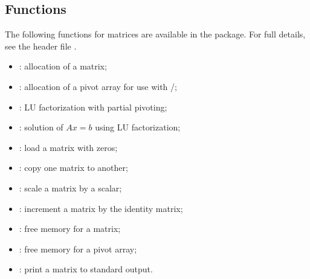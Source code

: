 \subsection{Functions}
The following functions for  matrices are available
in the {\band} package.  For full details, see the header file .
\begin{itemize}
\item {}: allocation of a  matrix;
\item {}: allocation of a pivot array for use
      with /;
\item {}: LU factorization with partial pivoting;
\item {}: solution of $Ax = b$ using LU factorization;
\item {}: load a matrix with zeros;
\item {}: copy one matrix to another;
\item {}: scale a matrix by a scalar;
\item {}: increment a matrix by the identity matrix;
\item {}: free memory for a  matrix;
\item {}: free memory for a pivot array;
\item {}: print a  matrix to standard output.
\end{itemize}
